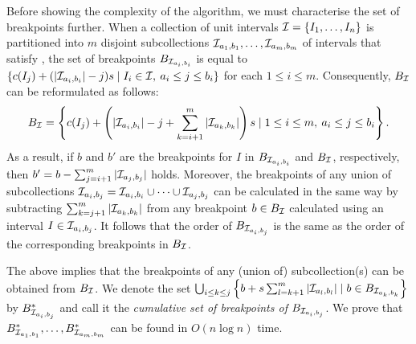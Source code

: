 Before showing the complexity of the algorithm, we must characterise the set of breakpoints further.
When a collection of unit intervals $\mathcal{I} =\{I_1,\ldots,I_n\}$ is partitioned into $m$ disjoint subcollections $\mathcal{I}_{a_1,b_1},\ldots,\mathcal{I}_{a_{m},b_{m}}$ of intervals that satisfy , %
the set of breakpoints $B_{\mathcal{I}_{a_i,b_i}}$ is equal to $\{c(I_j)+(|\mathcal{I}_{a_i,b_i}|-j)s\mid I_i\in \mathcal{I},\:a_i\le j \le b_i\}$ for each $1\le i \le m$.
Consequently, $B_{\mathcal{I}}$ can be reformulated as follows:
\begin{gather*}
    B_{\mathcal{I}} = \left\{c(I_j) + \left(|\mathcal{I}_{a_i,b_i}|-j + \sum_{k=i+1}^m |\mathcal{I}_{a_k,b_k}|\right)s\mid 1\le i \le m,\: a_i\le j \le b_i\right\}.
\end{gather*}
As a result, if $b$ and $b'$ are the breakpoints for $I$ in $B_{\mathcal{I}_{a_i,b_i}}$ and $B_{\mathcal{I}}$, respectively, then $b' = b -\sum_{j=i+1}^m |\mathcal{I}_{a_j,b_j}|$ holds. 
Moreover, the breakpoints of any union of subcollections $\mathcal{I}_{a_i,b_j} = \mathcal{I}_{a_i,b_i}\cup\cdots\cup\mathcal{I}_{a_j,b_j}$ can be calculated in the same way by subtracting $\sum_{k=j+1}^m |\mathcal{I}_{a_k,b_k}|$ from any breakpoint $b\in B_{\mathcal{I}}$ calculated using an interval $I \in \mathcal{I}_{a_i,b_j}$.
It follows that the order of $B_{\mathcal{I}_{a_i,b_j}}$ is the same as the order of the corresponding breakpoints in $B_{\mathcal{I}}$.

The above implies that the breakpoints of any (union of) subcollection(s) can be obtained from $B_{\mathcal{I}}$.
We denote the set $\bigcup_{i\le k \le j}\left\{b+s\sum_{l=k+1}^m |\mathcal{I}_{a_l,b_l}|\mid b \in B_{\mathcal{I}_{a_k,b_k}}\right\}$ by $B^*_{\mathcal{I}_{a_i,b_j}}$ and call it the \emph{cumulative set of breakpoints of $B_{\mathcal{I}_{a_i,b_j}}$}.
We prove that $B^*_{\mathcal{I}_{a_1,b_1}},\ldots,B^*_{\mathcal{I}_{a_m,b_m}}$ can be found in $O(n\log n)$ time.

